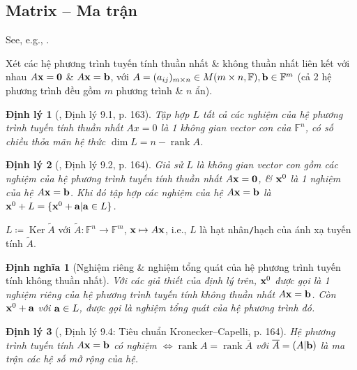 \documentclass{article}
\newtheorem{dinhly}{Định lý}
\newtheorem{dinhnghia}{Định nghĩa}
\begin{document}
\subsection{Matrix -- Ma trận}
See, e.g., \cite[Chap. 3, \S9: Cấu trúc nghiệm của hệ phương trình tuyến tính, pp. 163--165]{Hung_linear_algebra}.

Xét các hệ phương trình tuyến tính thuần nhất \& không thuần nhất liên kết với nhau $A{\bf x} = {\bf0}$ \& $A{\bf x} = {\bf b}$, với $A = (a_{ij})_{m\times n}\in M(m\times n,\mathbb{F}),{\bf b}\in\mathbb{F}^m$ (cả 2 hệ phương trình đều gồm $m$ phương trình \& $n$ ẩn).

\begin{dinhly}[\cite{Hung_linear_algebra}, Định lý 9.1, p. 163]
	Tập hợp $L$ tất cả các nghiệm của hệ phương trình tuyến tính thuần nhất $Ax = 0$ là 1 không gian vector con của $\mathbb{F}^n$, có số chiều thỏa mãn hệ thức $\dim L = n - \operatorname{rank}A$.
\end{dinhly}

\begin{dinhly}[\cite{Hung_linear_algebra}, Định lý 9.2, p. 164]
	Giả sử $L$ là không gian vector con gồm các nghiệm của hệ phương trình tuyến tính thuần nhất $A{\bf x} = {\bf0}$, \& ${\bf x}^0$ là 1 nghiệm của hệ $A{\bf x} = {\bf b}$. Khi đó tập hợp các nghiệm của hệ $A{\bf x} = {\bf b}$ là ${\bf x}^0 + L = \{{\bf x}^0 + {\bf a}|{\bf a}\in L\}$.
\end{dinhly}
$L\coloneqq\operatorname{Ker}\tilde{A}$ với $\tilde{A}:\mathbb{F}^n\to\mathbb{F}^m$, ${\bf x}\mapsto A{\bf x}$, i.e., $L$ là hạt nhân{\tt/}hạch của ánh xạ tuyến tính $\tilde{A}$.

\begin{dinhnghia}[Nghiệm riêng \& nghiệm tổng quát của hệ phương trình tuyến tính không thuần nhất]
	Với các giả thiết của định lý trên, ${\bf x}^0$ được gọi là 1 \emph{nghiệm riêng} của hệ phương trình tuyến tính không thuần nhất $A{\bf x} = {\bf b}$. Còn ${\bf x}^0 + {\bf a}$ với ${\bf a}\in L$, được gọi là \emph{nghiệm tổng quát} của hệ phương trình đó.
\end{dinhnghia}

\begin{dinhly}[\cite{Hung_linear_algebra}, Định lý 9.4: Tiêu chuẩn Kronecker--Capelli, p. 164]
	Hệ phương trình tuyến tính $A{\bf x} = {\bf b}$ có nghiệm $\Leftrightarrow\operatorname{rank}A = \operatorname{rank}\overline{A}$ với $\overline{A} = (A|{\bf b})$ là ma trận các hệ số mở rộng của hệ.
\end{dinhly}
\end{document}
